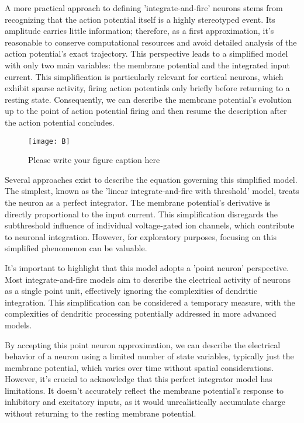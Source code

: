 A more practical approach to defining 'integrate-and-fire' neurons stems from recognizing that the action potential itself is a highly stereotyped event. Its amplitude carries little information; therefore, as a first approximation, it's reasonable to conserve computational resources and avoid detailed analysis of the action potential's exact trajectory. This perspective leads to a simplified model with only two main variables: the membrane potential and the integrated input current. This simplification is particularly relevant for cortical neurons, which exhibit sparse activity, firing action potentials only briefly before returning to a resting state. Consequently, we can describe the membrane potential's evolution up to the point of action potential firing and then resume the description after the action potential concludes.

\begin{figure}[t]
\sidecaption[t]
\centering
\texttt{[image: B]}
\caption{Please write your figure caption here}
\label{fig:A2}       %
\end{figure}


Several approaches exist to describe the equation governing this simplified model. The simplest, known as the 'linear integrate-and-fire with threshold' model, treats the neuron as a perfect integrator. The membrane potential's derivative is directly proportional to the input current. This simplification disregards the subthreshold influence of individual voltage-gated ion channels, which contribute to neuronal integration. However, for exploratory purposes, focusing on this simplified phenomenon can be valuable.

It's important to highlight that this model adopts a 'point neuron' perspective. Most integrate-and-fire models aim to describe the electrical activity of neurons as a single point unit, effectively ignoring the complexities of dendritic integration. This simplification can be considered a temporary measure, with the complexities of dendritic processing potentially addressed in more advanced models.

By accepting this point neuron approximation, we can describe the electrical behavior of a neuron using a limited number of state variables, typically just the membrane potential, which varies over time without spatial considerations. However, it's crucial to acknowledge that this perfect integrator model has limitations. It doesn't accurately reflect the membrane potential's response to inhibitory and excitatory inputs, as it would unrealistically accumulate charge without returning to the resting membrane potential.


